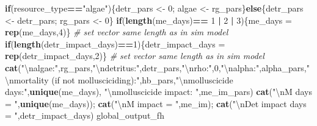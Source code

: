 \documentclass[10,portrait]{article}
\newenvironment{Shaded}{\begin{snugshade}}{\end{snugshade}}
\newcommand{\KeywordTok}[1]{\textcolor[rgb]{0.13,0.29,0.53}{\textbf{#1}}}
\newcommand{\DecValTok}[1]{\textcolor[rgb]{0.00,0.00,0.81}{#1}}
\newcommand{\CharTok}[1]{\textcolor[rgb]{0.31,0.60,0.02}{#1}}
\newcommand{\StringTok}[1]{\textcolor[rgb]{0.31,0.60,0.02}{#1}}
\newcommand{\CommentTok}[1]{\textcolor[rgb]{0.56,0.35,0.01}{\textit{#1}}}
\newcommand{\ControlFlowTok}[1]{\textcolor[rgb]{0.13,0.29,0.53}{\textbf{#1}}}
\newcommand{\OperatorTok}[1]{\textcolor[rgb]{0.81,0.36,0.00}{\textbf{#1}}}
\newcommand{\NormalTok}[1]{#1}
\begin{document}
\begin{Shaded}
\begin{Highlighting}[]
{{{        
        \ControlFlowTok{if}\NormalTok{(resource_type}\OperatorTok{==}\StringTok{"algae"}\NormalTok{)\{detr_pars <-}\StringTok{ }\DecValTok{0}\NormalTok{; algae <-}\StringTok{ }\NormalTok{rg_pars\}}\ControlFlowTok{else}\NormalTok{\{detr_pars <-}\StringTok{ }\NormalTok{detr_pars; rg_pars <-}\StringTok{ }\DecValTok{0}\NormalTok{\}}
        \ControlFlowTok{if}\NormalTok{(}\KeywordTok{length}\NormalTok{(me_days)}\OperatorTok{==}\StringTok{ }\DecValTok{1} \OperatorTok{|}\StringTok{ }\DecValTok{2} \OperatorTok{|}\StringTok{ }\DecValTok{3}\NormalTok{)\{me_days =}\StringTok{ }\KeywordTok{rep}\NormalTok{(me_days,}\DecValTok{4}\NormalTok{)\} }\CommentTok{# set vector same length as in sim model}
        \ControlFlowTok{if}\NormalTok{(}\KeywordTok{length}\NormalTok{(detr_impact_days)}\OperatorTok{==}\DecValTok{1}\NormalTok{)\{detr_impact_days =}\StringTok{ }\KeywordTok{rep}\NormalTok{(detr_impact_days,}\DecValTok{2}\NormalTok{)\} }\CommentTok{# set vector same length as in sim model}
        \KeywordTok{cat}\NormalTok{(}\StringTok{"}\CharTok{\textbackslash{}n}\StringTok{algae:"}\NormalTok{,rg_pars,}\StringTok{"}\CharTok{\textbackslash{}n}\StringTok{detritus:"}\NormalTok{,detr_pars,}\StringTok{"}\CharTok{\textbackslash{}n}\StringTok{rho:"}\NormalTok{,}\DecValTok{0}\NormalTok{,}\StringTok{"}\CharTok{\textbackslash{}n}\StringTok{alpha:"}\NormalTok{,alpha_pars,}\StringTok{"}\CharTok{\textbackslash{}n}\StringTok{mortality (if not mollusciciding):"}\NormalTok{,hb_pars,}\StringTok{"}\CharTok{\textbackslash{}n}\StringTok{molluscicide days:"}\NormalTok{,}\KeywordTok{unique}\NormalTok{(me_days), }\StringTok{"}\CharTok{\textbackslash{}n}\StringTok{molluscicide impact: "}\NormalTok{,me_im_pars)}
        \KeywordTok{cat}\NormalTok{(}\StringTok{"}\CharTok{\textbackslash{}n}\StringTok{M days = "}\NormalTok{,}\KeywordTok{unique}\NormalTok{(me_days)); }\KeywordTok{cat}\NormalTok{(}\StringTok{"}\CharTok{\textbackslash{}n}\StringTok{M impact = "}\NormalTok{,me_im); }\KeywordTok{cat}\NormalTok{(}\StringTok{"}\CharTok{\textbackslash{}n}\StringTok{Det impact days = "}\NormalTok{,detr_impact_days) }
\NormalTok{        global_output_fh}
        
}}}
\end{Highlighting}
\end{Shaded}
\end{document}
